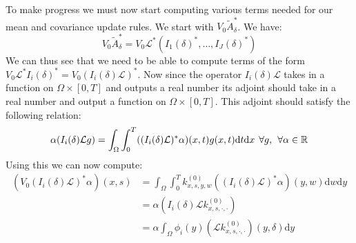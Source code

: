 \documentclass{article}
\theoremstyle{definition}
\theoremstyle{remark}
\theoremstyle{remark}
\begin{document}
\noindent To make progress we must now start computing various terms needed for our mean and covariance update rules. We start with $V_{0}\tilde{A}_{\delta}^{*}$. We have:
\begin{equation*}
    V_{0}\tilde{A}_{\delta}^{*}=V_{0}\mathcal{L}^{*}(I_{1}(\delta)^{*},\dots,I_{J}(\delta)^{*})
\end{equation*}
We can thus see that we need to be able to compute terms of the form $V_{0}\mathcal{L}^{*}I_{i}(\delta)^{*}=V_{0}(I_{i}(\delta)\mathcal{L})^{*}$. Now since the operator $I_{i}(\delta)\mathcal{L}$ takes in a function on $\Omega\times[0,T]$ and outputs a real number its adjoint should take in a real number and output a function on $\Omega\times[0,T]$. This adjoint should satisfy the following relation:
\begin{equation}
    \alpha(I_{i}(\delta)\mathcal{L}g)=\int_{\Omega}\int_{0}^{T}((I_{i}(\delta)\mathcal{L})^{*}\alpha)(x,t)g(x,t)\mathrm{d}t\mathrm{d}x \hspace{0.15cm} \forall{g}, \hspace{0.15cm} \forall\alpha\in\mathbb{R}
\end{equation}
Using this we can now compute:
\begin{align*}
    (V_{0}(I_{i}(\delta)\mathcal{L})^{*}\alpha)(x,s) &= \int_{\Omega}\int_{0}^{T}k_{x,s,y,w}^{(0)}((I_{i}(\delta)\mathcal{L})^{*}\alpha)(y,w)\mathrm{d}w\mathrm{d}y \\
    &=\alpha (I_{i}(\delta)\mathcal{L}k_{x,s,\boldsymbol{\cdot},\boldsymbol{\cdot}}^{(0)}) \\
    &=\alpha\int_{\Omega}\phi_{i}(y)(\mathcal{L}k_{x,s,\boldsymbol{\cdot},\boldsymbol{\cdot}}^{(0)})(y,\delta)\mathrm{d}y
\end{align*}
\end{document}
